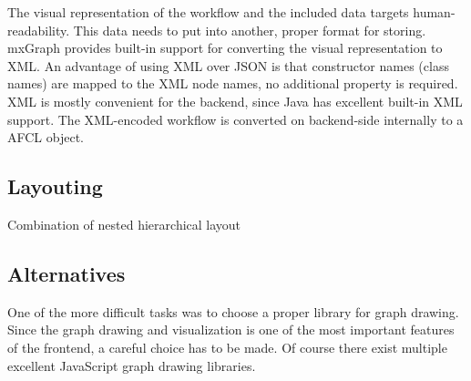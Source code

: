 \documentclass[a4paper,12pt,pdftex,halfparskip,cleardoubleempty,bibtotoc,liststotoc]{scrbook}
\begin{document}
The visual representation of the workflow and the included data targets human-readability. This data needs to put into another, proper format for storing. mxGraph provides built-in support for converting the visual representation to XML. An advantage of using XML over JSON is that constructor names (class names) are mapped to the XML node names, no additional property is required.
XML is mostly convenient for the backend, since Java has excellent built-in XML support. The XML-encoded workflow is converted on backend-side internally to a AFCL object.

\subsection{Layouting}

Combination of nested hierarchical layout

\label{sec:graph-alternatives}
\subsection{Alternatives}

One of the more difficult tasks was to choose a proper library for graph drawing. Since the graph drawing and visualization is one of the most important features of the frontend, a careful choice has to be made. Of course there exist multiple excellent JavaScript graph drawing libraries.
\end{document}
